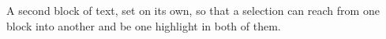 A second block of text, set on its own, so that a selection can reach from
one block into another and be one highlight in both of them.
